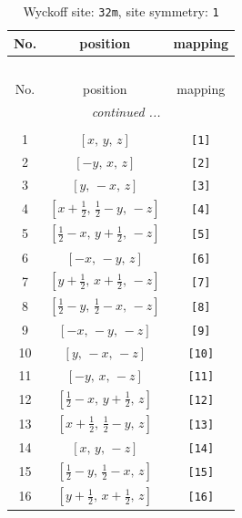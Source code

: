 \documentclass[fleqn,8pt]{jsarticle}
\begin{document}
\renewcommand{\arraystretch}{1.2}
\begin{longtable}{ccc}
\caption{Wyckoff site: {\tt 32m}, site symmetry: {\tt 1}}
 \\
 \hline \hline
No. & position & mapping \\ \hline \endfirsthead

\multicolumn{2}{l}{\tablename\ \thetable{}} \\
 \hline \hline
No. & position & mapping \\ \hline \endhead

 \hline \hline
\multicolumn{2}{r}{\footnotesize\it continued ...} \\ \endfoot

 \hline \hline
\multicolumn{2}{r}{} \\ \endlastfoot

1 & $\left[ x,\, y,\, z \right]$ & {\tt [1]} \\ \hline
2 & $\left[ - y,\, x,\, z \right]$ & {\tt [2]} \\ \hline
3 & $\left[ y,\, - x,\, z \right]$ & {\tt [3]} \\ \hline
4 & $\left[ x + \frac{1}{2},\, \frac{1}{2} - y,\, - z \right]$ & {\tt [4]} \\ \hline
5 & $\left[ \frac{1}{2} - x,\, y + \frac{1}{2},\, - z \right]$ & {\tt [5]} \\ \hline
6 & $\left[ - x,\, - y,\, z \right]$ & {\tt [6]} \\ \hline
7 & $\left[ y + \frac{1}{2},\, x + \frac{1}{2},\, - z \right]$ & {\tt [7]} \\ \hline
8 & $\left[ \frac{1}{2} - y,\, \frac{1}{2} - x,\, - z \right]$ & {\tt [8]} \\ \hline
9 & $\left[ - x,\, - y,\, - z \right]$ & {\tt [9]} \\ \hline
10 & $\left[ y,\, - x,\, - z \right]$ & {\tt [10]} \\ \hline
11 & $\left[ - y,\, x,\, - z \right]$ & {\tt [11]} \\ \hline
12 & $\left[ \frac{1}{2} - x,\, y + \frac{1}{2},\, z \right]$ & {\tt [12]} \\ \hline
13 & $\left[ x + \frac{1}{2},\, \frac{1}{2} - y,\, z \right]$ & {\tt [13]} \\ \hline
14 & $\left[ x,\, y,\, - z \right]$ & {\tt [14]} \\ \hline
15 & $\left[ \frac{1}{2} - y,\, \frac{1}{2} - x,\, z \right]$ & {\tt [15]} \\ \hline
16 & $\left[ y + \frac{1}{2},\, x + \frac{1}{2},\, z \right]$ & {\tt [16]} \\ \hline

\end{longtable}
\end{document}
